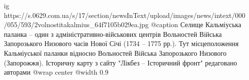 
 
 
 
 

\ifcmt
  ig https://s.0629.com.ua/s/17/section/newsInText/upload/images/news/intext/000/055/593/2volnostitakalmius_64f7105b029ea.jpg
	@caption Селище Кальміуська паланка – один з адміністративно-військових центрів Вольностей Війська Запорозького Низового часів Нової Січі (1734 – 1775 рр.). Тут місцеположення Кальміуської паланки відносно Вольностей Війська Запорозького Низового (Запорожжя). Історичну карту з сайту "Лікбез – Історичний фронт" редаговано авторами
  @wrap center
  @width 0.9
\fi
